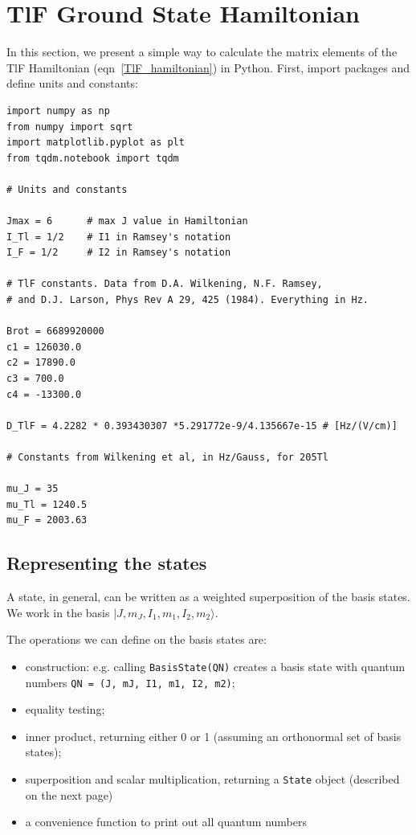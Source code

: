 \section{TlF Ground State Hamiltonian}
\label{TlF_hamiltonian_python}

In this section, we present a simple way to calculate the matrix elements of the
TlF Hamiltonian (eqn~\ref{TlF_hamiltonian}) in Python. First, import packages
and define units and constants:

\begin{lstlisting}
import numpy as np
from numpy import sqrt
import matplotlib.pyplot as plt
from tqdm.notebook import tqdm

# Units and constants

Jmax = 6      # max J value in Hamiltonian
I_Tl = 1/2    # I1 in Ramsey's notation
I_F = 1/2     # I2 in Ramsey's notation

# TlF constants. Data from D.A. Wilkening, N.F. Ramsey,
# and D.J. Larson, Phys Rev A 29, 425 (1984). Everything in Hz.

Brot = 6689920000
c1 = 126030.0
c2 = 17890.0
c3 = 700.0
c4 = -13300.0

D_TlF = 4.2282 * 0.393430307 *5.291772e-9/4.135667e-15 # [Hz/(V/cm)]

# Constants from Wilkening et al, in Hz/Gauss, for 205Tl

mu_J = 35
mu_Tl = 1240.5
mu_F = 2003.63
\end{lstlisting}

\subsection{Representing the states}

A state, in general, can be written as a weighted superposition of the basis states. We work in the basis $|J, m_J, I_1, m_1, I_2, m_2\rangle$.

The operations we can define on the basis states are:

\begin{itemize}
   \item construction: e.g. calling \verb`BasisState(QN)` creates a basis state
      with quantum numbers \verb`QN = (J, mJ, I1, m1, I2, m2)`;
   \item equality testing;
   \item inner product, returning either 0 or 1 (assuming an orthonormal set of
       basis states);
   \item superposition and scalar multiplication, returning a \verb`State`
       object (described on the next page)
   \item a convenience function to print out all quantum numbers
\end{itemize}

